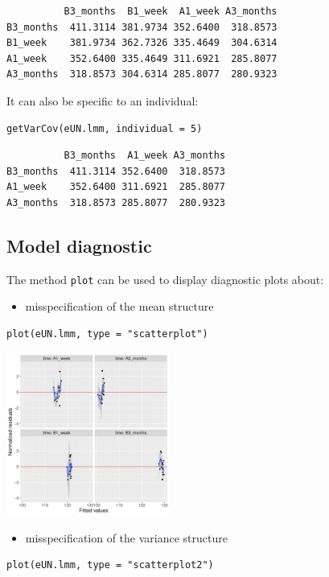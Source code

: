 \documentclass[12pt]{article}
\begin{document}
\begin{verbatim}
          B3_months  B1_week  A1_week A3_months
B3_months  411.3114 381.9734 352.6400  318.8573
B1_week    381.9734 362.7326 335.4649  304.6314
A1_week    352.6400 335.4649 311.6921  285.8077
A3_months  318.8573 304.6314 285.8077  280.9323
\end{verbatim}


It can also be specific to an individual:
\lstset{language=r,label= ,caption= ,captionpos=b,numbers=none}
\begin{lstlisting}
getVarCov(eUN.lmm, individual = 5)
\end{lstlisting}

\begin{verbatim}
          B3_months  A1_week A3_months
B3_months  411.3114 352.6400  318.8573
A1_week    352.6400 311.6921  285.8077
A3_months  318.8573 285.8077  280.9323
\end{verbatim}


\clearpage

\subsection{Model diagnostic}
\label{sec:org4763f40}

The method \texttt{plot} can be used to display diagnostic plots about:
\begin{itemize}
\item misspecification of the mean structure
\end{itemize}
\lstset{language=r,label= ,caption= ,captionpos=b,numbers=none}
\begin{lstlisting}
plot(eUN.lmm, type = "scatterplot")
\end{lstlisting}

\begin{center}
\includegraphics[width=0.4\textwidth]{./figures/diag-scatterplot.pdf}
\end{center}

\begin{itemize}
\item misspecification of the variance structure
\end{itemize}
\lstset{language=r,label= ,caption= ,captionpos=b,numbers=none}
\begin{lstlisting}
plot(eUN.lmm, type = "scatterplot2")
\end{lstlisting}
\end{document}
